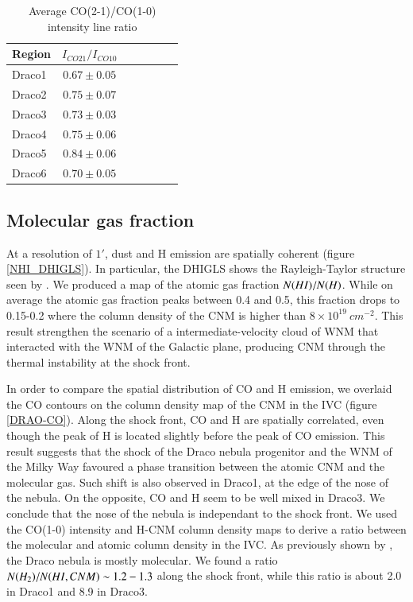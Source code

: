 \documentclass[traditabstract]{aa}
\begin{document}
\begin{table}[h]
  \centering
  \footnotesize
  \caption{Average CO(2-1)/CO(1-0) intensity line ratio}
  \begin{tabular}{lcccccc}
    \hline \hline
    Region & $I_{CO21}/I_{CO10}$ \\ \hline
    Draco1 &   $0.67\pm 0.05$    \\
    Draco2 &   $0.75\pm 0.07$    \\
    Draco3 &   $0.73\pm 0.03$    \\
    Draco4 &   $0.75\pm 0.06$    \\
    Draco5 &   $0.84\pm 0.06$    \\
    Draco6 &   $0.70\pm 0.05$    \\ \hline
  \end{tabular}
\end{table}


   \subsection{Molecular gas fraction}

   At a resolution of $1'$, dust and H emission are spatially coherent (figure \ref{NHI_DHIGLS}). In particular, the DHIGLS shows the Rayleigh-Taylor structure seen by \cite{MAMD_2017b}. We produced a map of the atomic gas fraction $N(H\rmnum{1})/N(H)$. While on average the atomic gas fraction peaks between 0.4 and 0.5, this fraction drops to 0.15-0.2 where the column density of the CNM is higher than $8\times 10^{19}\: cm^{-2}$. This result strengthen the scenario of a intermediate-velocity cloud of WNM that interacted with the WNM of the Galactic plane, producing CNM through the thermal instability at the shock front.

   In order to compare the spatial distribution of CO and H emission, we overlaid the CO contours on the column density map of the CNM in the IVC (figure \ref{DRAO-CO}). Along the shock front, CO and H are spatially correlated, even though the peak of H is located slightly before the peak of CO emission. This result suggests that the shock of the Draco nebula progenitor and the WNM of the Milky Way favoured a phase transition between the atomic CNM and the molecular gas.
Such shift is also observed in Draco1, at the edge of the nose of the nebula. On the opposite, CO and H seem to be well mixed in Draco3. We conclude that the nose of the nebula is independant to the shock front.
We used the CO(1-0) intensity and H-CNM column density maps to derive a ratio between the molecular and atomic column density in the IVC. As previously shown by \cite{Planck_XXIV_2011,MAMD_2017b}, the Draco nebula is mostly molecular. We found a ratio $N(H_2)/N(H\rmnum{1},CNM)\sim 1.2-1.3$ along the shock front, while this ratio is about 2.0 in Draco1 and 8.9 in Draco3.
\end{document}
